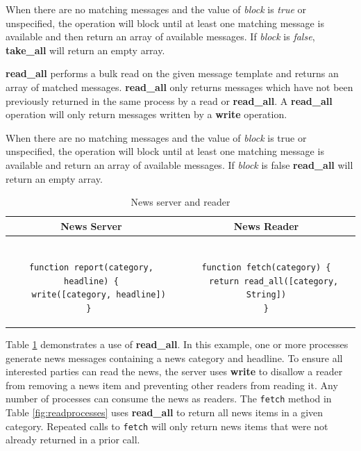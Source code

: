 \documentclass[lnicst]{svmultln}
\begin{document}
When there are no matching messages and the value of \textit{block} is \textit{true} or unspecified, the operation will block until at least one matching message is available and then return an array of available messages. If \textit{block} is \textit{false}, \textbf{take\_all} will return an empty array.

\textbf{read\_all} performs a bulk read on the given message template and returns an array of matched messages. \textbf{read\_all} only returns messages which have not been previously returned in the same process by a read or \textbf{read\_all}. A \textbf{read\_all} operation will only return messages written by a \textbf{write} operation.

When there are no matching messages and the value of \textit{block} is true or unspecified, the operation will block until at least one matching message is available and return an array of available messages. If \textit{block} is false \textbf{read\_all} will return an empty array.

\begin{table}
\centering
\caption{News server and reader}
\begin{tabular}{|c|c|} \hline
\textbf{News Server} & \textbf{News Reader} \\ \hline
\begin{minipage}{2.45in}
\begin{verbatim}

function report(category, headline) {
   write([category, headline])
} 

\end{verbatim}
\end{minipage}
&
\begin{minipage}{2.5in}
\begin{verbatim}

function fetch(category) {
   return read_all([category, String])
}

\end{verbatim}
\end{minipage}
\\ \hline
\end{tabular}
\label{fig:newsreader}
\end{table}

Table \ref{fig:newsreader} demonstrates a use of \textbf{read\_all}. In this example, one or more processes generate news messages containing a news category and headline. To ensure all interested parties can read the news, the server uses \textbf{write} to disallow a reader from removing a news item and preventing other readers from reading it. Any number of processes can consume the news as readers. The \texttt{fetch} method in Table \ref{fig:readprocesses} uses \textbf{read\_all} to return all news items in a given category. Repeated calls to \texttt{fetch} will only return news items that were not already returned in a prior call.
    
\end{document}
